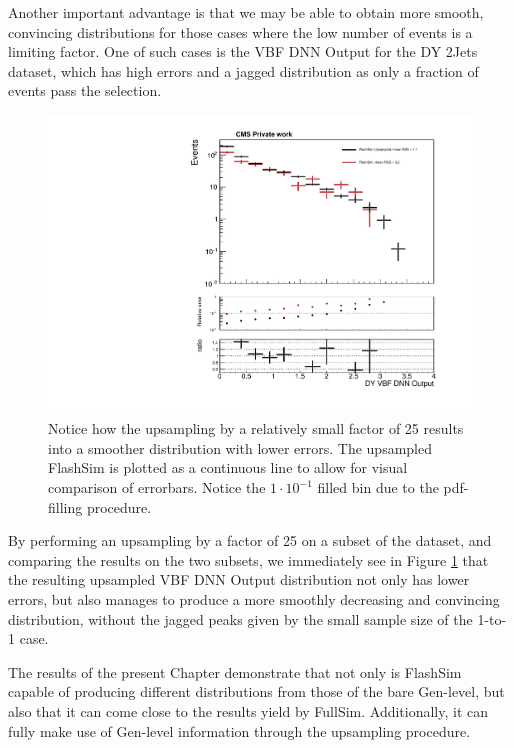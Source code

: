    Another important advantage is that we may be able to obtain more smooth, convincing distributions for those cases where the low number of events is a limiting factor. One of such cases is the VBF DNN Output for the DY 2Jets dataset, which has high errors and a jagged distribution as only a fraction of events pass the selection.
   
          \begin{figure}
    \centering
    \includegraphics[width=\linewidth]{gfx/ch6/DY2Jets_DNN18Atan____log_upsampled.pdf}
    \caption[Upsampling on DY]{Notice how the upsampling by a relatively small factor of 25 results into a smoother distribution with lower errors. The upsampled FlashSim is plotted as a continuous line to allow for visual comparison of errorbars. Notice the $1\cdot 10^{-1}$ filled bin due to the pdf-filling procedure.}
    \label{fig:updnnDY}
   \end{figure}
   
   By performing an upsampling by a factor of 25 on a subset of the dataset, and comparing the results on the two subsets, we immediately see in Figure \ref{fig:updnnDY} that the resulting upsampled VBF DNN Output distribution not only has lower errors, but also manages to produce a more smoothly decreasing and convincing distribution, without the jagged peaks given by the small sample size of the 1-to-1 case.
   
  The results of the present Chapter demonstrate that not only is FlashSim capable of producing different distributions from those of the bare Gen-level, but also that it can come close to the results yield by FullSim. Additionally, it can fully make use of Gen-level information through the upsampling procedure.